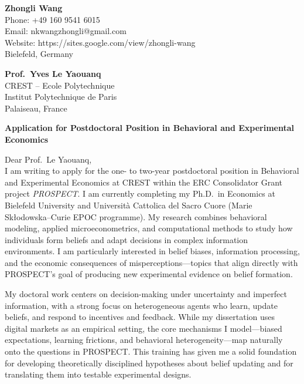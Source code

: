 \documentclass[11pt]{article}
\begin{document}
\noindent
\textbf{Zhongli Wang} \\
Phone: +49 160 9541 6015 \\
Email: nkwangzhongli@gmail.com \\
Website: https://sites.google.com/view/zhongli-wang \\
Bielefeld, Germany \\

\vspace{0.5cm}

\noindent
\textbf{Prof.\ Yves Le Yaouanq} \\
CREST -- Ecole Polytechnique \\
Institut Polytechnique de Paris \\
Palaiseau, France \\

\vspace{0.5cm}

\noindent
\textbf{Application for Postdoctoral Position in Behavioral and Experimental Economics} \\

\vspace{0.3cm}

\noindent Dear Prof.\ Le Yaouanq,\\[0.2cm]

I am writing to apply for the one- to two-year postdoctoral position in Behavioral and Experimental Economics at CREST within the ERC Consolidator Grant project \textit{PROSPECT}. I am currently completing my Ph.D.\ in Economics at Bielefeld University and Università Cattolica del Sacro Cuore (Marie Sk\l{}odowska--Curie EPOC programme). My research combines behavioral modeling, applied microeconometrics, and computational methods to study how individuals form beliefs and adapt decisions in complex information environments. I am particularly interested in belief biases, information processing, and the economic consequences of misperceptions---topics that align directly with PROSPECT's goal of producing new experimental evidence on belief formation.

My doctoral work centers on decision-making under uncertainty and imperfect information, with a strong focus on heterogeneous agents who learn, update beliefs, and respond to incentives and feedback. While my dissertation uses digital markets as an empirical setting, the core mechanisms I model---biased expectations, learning frictions, and behavioral heterogeneity---map naturally onto the questions in PROSPECT. This training has given me a solid foundation for developing theoretically disciplined hypotheses about belief updating and for translating them into testable experimental designs.
\end{document}

